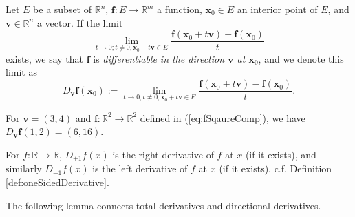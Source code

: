 \begin{defn}
  \label{def:directionalDerivative}
  Let $E$ be a subset of $\mathbb{R}^n$,
  $\mathbf{f}: E\rightarrow \mathbb{R}^m$ a function,
  $\mathbf{x}_0\in E$ an interior point of $E$,
  and $\mathbf{v}\in \mathbb{R}^n$ a vector.
  If the limit
  \begin{displaymath}
    \lim_{t\rightarrow 0;t\neq 0, \mathbf{x}_0+t\mathbf{v}\in E}
    \frac{\mathbf{f}(\mathbf{x}_0+t\mathbf{v})
      - \mathbf{f}(\mathbf{x}_0)}{t}
  \end{displaymath}
  exists, we say that $\mathbf{f}$ is
  \emph{differentiable in the direction $\mathbf{v}$ at $\mathbf{x}_0$},
  and we denote this limit as
  \begin{equation}
    \label{eq:directionalDerivative}
    D_\mathbf{v} \mathbf{f}(\mathbf{x}_0) :=
    \lim_{t\rightarrow0;t\neq 0, \mathbf{x}_0+t\mathbf{v}\in E}
    \frac{\mathbf{f}(\mathbf{x}_0+t\mathbf{v})
      - \mathbf{f}(\mathbf{x}_0)}{t}.
  \end{equation}
\end{defn}

\begin{exm}
  For $\mathbf{v}=(3,4)$ and
  $\mathbf{f}: \mathbb{R}^2\rightarrow\mathbb{R}^2$ defined in
  (\ref{eq:fSqaureComp}),
  we have $D_{\mathbf{v}}\mathbf{f}(1,2)=(6,16)$.
\end{exm}

\begin{exm}
  For $f: \mathbb{R}\rightarrow\mathbb{R}$,
  $D_{+1} f(x)$ is the right derivative of $f$ at $x$ (if it exists),
  and similarly $D_{-1}f(x)$ is the left derivative of $f$ at $x$
  (if it exists), c.f. Definition \ref{def:oneSidedDerivative}.
\end{exm}

\begin{rem}
  The following lemma connects total derivatives and directional derivatives.
\end{rem}

